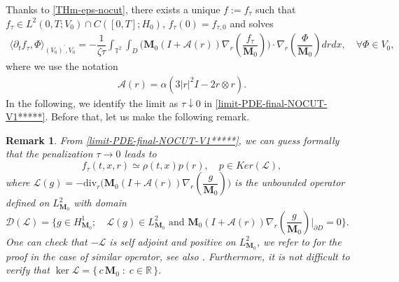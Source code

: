 \documentclass[a4paper,12pt, reqno]{amsart}
\newtheorem{remark}[theorem]{Remark}
\newcommand{\Div}{\text{div}}
\begin{document}
      Thanks to   \autoref{THm-eps-nocut}, there exists  a unique $f:=f_\tau$ such that   $f_\tau \in L^2(0, T;V_0) \cap C([0, T];H_0)$, $f_\tau(0)=f_{\tau,0} $ and solves
        \begin{align}\label{limit-PDE-final-NOCUT-V1*****}
    \langle\partial_t f_\tau,\Phi\rangle_{(V_0)^\prime,V_0}=- \dfrac{1}{\zeta \tau}\int_{\mathbb{T}^2}\int_D\bigl(\mathbf{M}_0 (I+\mathcal{A}(r))\nabla_r(\dfrac{f_\tau}{\mathbf{M}_0})\bigr)\cdot \nabla_r\left(\dfrac{\Phi}{\mathbf{M}_0}\right) drdx, \quad \forall \Phi\in V_0,
\end{align}
where we use the notation 
\begin{align}\label{limit-matrix}
 \mathcal{A}(r)= \alpha(3 \left\vert r\right\vert^2I-2r\otimes r).   
\end{align}
In the following, we identify the limit as $\tau \downarrow 0$ in \eqref{limit-PDE-final-NOCUT-V1*****}. Before that, let us make the following remark.
\begin{remark}
    From \eqref{limit-PDE-final-NOCUT-V1*****}, we can guess formally  that the penalization $\tau \to 0$ leads to 
$$f_\tau(t,x,r) \simeq \rho(t,x)p(r), \quad p\in Ker(\mathcal{L}),$$
where $\mathcal{L}(g)=-\Div_r\bigl(\mathbf{M}_0 (I+\mathcal{A}(r))\nabla_r(\dfrac{g}{\mathbf{M}_0})\bigr)$ is the unbounded operator defined on  $L^2_{\mathbf{M}_0}$ with domain $\mathcal{D}(\mathcal{L})=\{ g\in H^1_{\mathbf{M}_0};\quad \mathcal{L}(g)\in L^2_{\mathbf{M}_0} \text{ and }  \mathbf{M}_0 (I+\mathcal{A}(r))\nabla_r(\dfrac{g}{\mathbf{M}_0})\vert_{\partial D}=0\}.$ One can check that $-\mathcal{L}$ is self adjoint and positive  on $L^2_{\mathbf{M}_0}$, we refer to \cite[Prop. 3.6.]{Masmoudi2008} for the proof in the case of  similar operator, see also \cite[Prop. 13]{tahraoui2025small}. Furthermore, it is not difficult to verify that
$\ker \mathcal{L} = \{\, c \, \mathbf{M}_0 \; : \; c \in \mathbb{R} \,\}.$
\end{remark}
\end{document}
